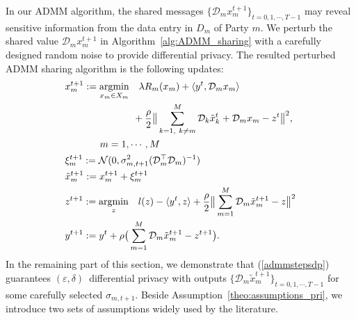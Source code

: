 In our ADMM algorithm, the shared messages $\{\mathcal{D}_mx_m^{t+1}\}_{t=0,1,\cdots,T-1}$ may reveal sensitive information from the data entry in $D_m$ of Party $m$. We perturb the shared value $\mathcal{D}_mx^{t+1}_m$ in Algorithm~\ref{alg:ADMM_sharing} with a carefully designed random noise to provide differential privacy. The resulted perturbed ADMM sharing algorithm is the following updates:
\begin{align}
  &x_{m}^{t+1}:=\underset{x_m\in X_m}{\text{argmin}}\quad\lambda R_m(x_m) + \langle y^t, \mathcal{D}_mx_m\rangle\nonumber\\
  &\quad\quad\quad\quad\quad\quad\quad + \frac{\rho}{2}\big\|\sum_{\substack{k=1,~k\neq m}}^{M}\mathcal{D}_k\tilde{x}_k^{t} + \mathcal{D}_mx_m - z^t\big\|^2, \nonumber\\&\hspace*{36pt} m=1,\cdots,M
  \nonumber\\
  &\xi_m^{t+1}:=\mathcal{N}(0,\sigma_{m,t+1}^2
  (\mathcal{D}_m^\top\mathcal{D}_m)^{-1}
  )\nonumber\\
  &\tilde{x}_m^{t+1}:= x_m^{t+1}+\xi_m^{t+1}\label{admmstepsdp}\\
  &z^{t+1}:=\underset{z}{\text{argmin}}\quad l(z)  - \langle y^t, z \rangle + \frac{\rho}{2} \big\|\sum_{m=1}^{M}\mathcal{D}_m\tilde{x}_m^{t+1} - z\big\|^2\nonumber\\
&y^{t+1}:=y^t + \rho\big(\sum_{m=1}^{M}\mathcal{D}_m\tilde{x}_m^{t+1} - z^{t+1}\big). \nonumber
\end{align}
In the remaining part of this section, we demonstrate that (\ref{admmstepsdp}) guarantees $(\varepsilon, \delta)$~differential privacy with outputs $\{\mathcal{D}_m\tilde{x}_m^{t+1}\}_{t=0,1,\cdots,T-1}$ for some carefully selected $\sigma_{m,t+1}$. Beside Assumption~\ref{theo:assumptions_pri}, we introduce two sets of assumptions widely used by the literature.
